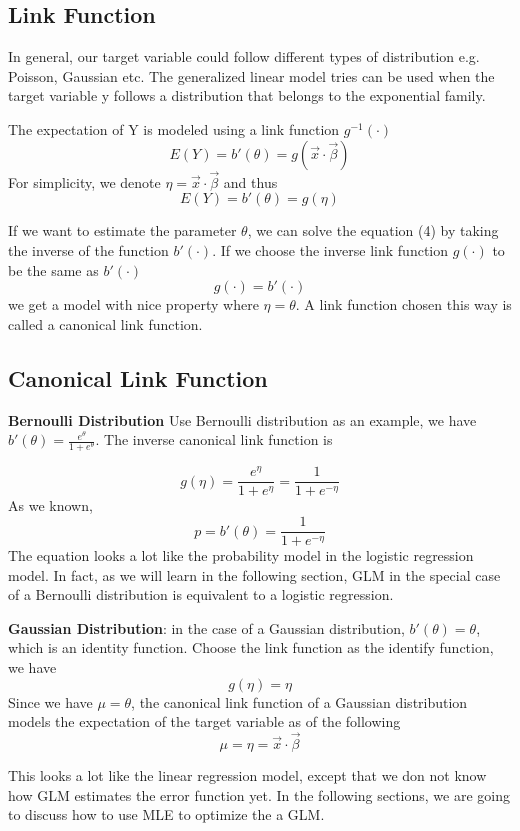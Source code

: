 \documentclass[12pt, oneside]{article}
\begin{document}
\subsection{Link Function}
In general, our target variable could follow different types of distribution e.g. Poisson, Gaussian etc. The generalized linear model tries can be used when the target variable y follows a distribution that belongs to the exponential family. 

The expectation of Y is modeled using a link function $g^{-1}(\cdot)$ 
$$E(Y)=b'(\theta)=g(\vec{x}\cdot\vec{\beta})$$
For simplicity, we denote $\eta=\vec{x}\cdot\vec{\beta}$ and thus 
\begin{equation}
E(Y)=b'(\theta)=g(\eta)
\end{equation}


If we want to estimate the parameter $\theta$, we can solve the equation (4) by taking the inverse of the function $b'(\cdot)$. If we choose the inverse link function $g(\cdot)$ to be the same as $b'(\cdot)$
\begin{equation}
g(\cdot)=b'(\cdot)
\end{equation}
we get a model with nice property where $\eta=\theta$. A link function chosen this way is called a canonical link function.

\subsection{Canonical Link Function}
\textbf{Bernoulli Distribution} Use Bernoulli distribution as an example, we have $b'(\theta)=\frac{e^\theta}{1+e^\theta}$. The inverse canonical link function is 

$$g(\eta)=\frac{e^{\eta}}{1+e^{\eta}}=\frac{1}{1+e^{-\eta}}$$
As we known,  $$p=b'(\theta)=\frac{1}{1+e^{-\eta}}$$ The equation looks a lot like the probability model in the logistic regression model. In fact, as we will learn in the following section, GLM in the special case of a Bernoulli distribution is equivalent to a logistic regression.

\textbf{Gaussian Distribution}: in the case of a Gaussian distribution, $b'(\theta)=\theta$, which is an identity function. Choose the link function as the identify function, we have 
$$g(\eta)=\eta$$
Since we have $\mu=\theta$, the canonical link function of a Gaussian distribution models the expectation of the target variable as of the following
$$\mu=\eta=\vec{x}\cdot\vec{\beta}$$ 

This looks a lot like the linear regression model, except that we don not know how GLM estimates the error function yet. In the following sections, we are going to discuss how to use MLE to optimize the a GLM.
\end{document}
